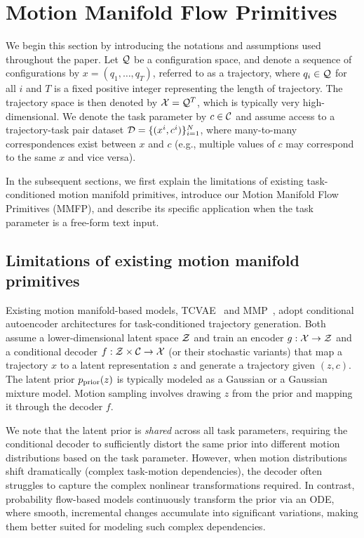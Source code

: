 \section{Motion Manifold Flow Primitives} 
We begin this section by introducing the notations and assumptions used throughout the paper. Let \({\cal Q}\) be a configuration space, and denote a sequence of configurations by \(x = (q_1, \ldots, q_T)\), referred to as a trajectory, where \(q_i \in {\cal Q}\) for all \(i\) and \(T\) is a fixed positive integer representing the length of trajectory. The trajectory space is then denoted by \({\cal X} = {\cal Q}^T\), which is typically very high-dimensional.
We denote the task parameter by \(c \in {\cal C}\) and assume access to a trajectory-task pair dataset \({\cal D} = \{(x^i, c^i)\}_{i=1}^{N}\), where many-to-many correspondences exist between \(x\) and \(c\) (e.g., multiple values of \(c\) may correspond to the same \(x\) and vice versa).

In the subsequent sections, we first explain the limitations of existing task-conditioned motion manifold primitives, introduce our Motion Manifold Flow Primitives (MMFP), and describe its specific application when the task parameter is a free-form text input.

\subsection{Limitations of existing motion manifold primitives}
\label{sec:limit}
Existing motion manifold-based models, TCVAE~\cite{noseworthy2020task} and MMP~\cite{lee2023equivariant}, adopt conditional autoencoder architectures for task-conditioned trajectory generation. Both assume a lower-dimensional latent space \({\cal Z}\) and train an encoder \(g : {\cal X} \to {\cal Z}\) and a conditional decoder \(f : {\cal Z} \times {\cal C} \to {\cal X}\) (or their stochastic variants) that map a trajectory \(x\) to a latent representation \(z\) and generate a trajectory given \((z, c)\). The latent prior \(p_{\rm prior}(z)\) is typically modeled as a Gaussian or a Gaussian mixture model. Motion sampling involves drawing \(z\) from the prior and mapping it through the decoder \(f\).

We note that the latent prior is {\it shared} across all task parameters, requiring the conditional decoder to sufficiently distort the same prior into different motion distributions based on the task parameter. However, when motion distributions shift dramatically (complex task-motion dependencies), the decoder often struggles to capture the complex nonlinear transformations required. In contrast, probability flow-based models continuously transform the prior via an ODE, where smooth, incremental changes accumulate into significant variations, making them better suited for modeling such complex dependencies.

